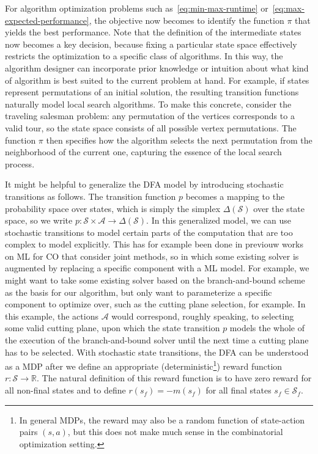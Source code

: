 \documentclass[a4paper]{report}
\theoremstyle{definition}
\theoremstyle{plain}
\begin{document}
For algorithm optimization problems such as~\eqref{eq:min-max-runtime} or~\eqref{eq:max-expected-performance}, the objective now
becomes to identify the function $\pi$ that yields the best performance.
%
Note that the definition of the intermediate states now becomes a key decision,
because fixing a particular state space effectively restricts the optimization
to a specific class of algorithms.
%
In this way, the algorithm designer can incorporate prior knowledge or intuition
about what kind of algorithm is best suited to the current problem at hand.
For example, if states represent permutations of an initial solution, the
resulting transition functions naturally model local search algorithms. To make
this concrete, consider the traveling salesman problem: any permutation of the
vertices corresponds to a valid tour, so the state space consists of all
possible vertex permutations. The function $\pi$ then specifies how the algorithm
selects the next permutation from the neighborhood of the current one, capturing
the essence of the local search process.


It might be helpful to generalize the DFA model by introducing stochastic
transitions as follows.
%
The transition function $p$ becomes a mapping to the probability space over
states, which is simply the simplex $\Delta(\mathcal{S})$ over the state space,
so we write $p : \mathcal{S} \times \mathcal{A} \rightarrow \Delta(\mathcal{S})$.
%
In this generalized model, we can use stochastic transitions to model certain
parts of the computation that are too complex to model explicitly.
%
This has for example been done in previouw works on ML for CO that consider
joint methods, so in which some existing solver is augmented by replacing a
specific component with a ML model.
%
For example, we might want to take some existing solver based on the
branch-and-bound scheme as the basis for our algorithm, but only want to
parameterize a specific component to optimize over, such as the cutting plane
selection, for example.
%
In this example, the actions $\mathcal{A}$ would correspond, roughly speaking, to
selecting some valid cutting plane, upon which the state transition $p$
models the whole of the execution of the branch-and-bound solver until the next
time a cutting plane has to be selected.
With stochastic state transitions, the DFA can be understood as a MDP after we
define an appropriate (deterministic\footnote{In general MDPs, the reward may
  also be a random function of state-action pairs $(s,a)$, but this does not
  make much sense in the combinatorial optimization setting.}) reward function
$r : \mathcal{S} \rightarrow \mathbb{R}$.
%
The natural definition of this reward function is to have zero reward for all
non-final states and to define $r(s_f) = -m(s_f)$ for all final states $s_f \in \mathcal{S}_f$.
\end{document}
